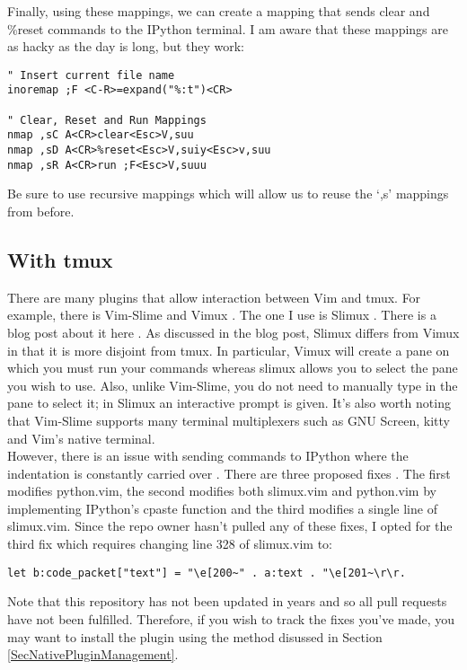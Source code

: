 \documentclass[10pt]{article}
\begin{document}
Finally, using these mappings, we can create a mapping that sends clear and \%reset commands to the IPython terminal. I
am aware that these mappings are as hacky as the day is long, but they work:
\begin{lstlisting}
" Insert current file name
inoremap ;F <C-R>=expand("%:t")<CR>

" Clear, Reset and Run Mappings
nmap ,sC A<CR>clear<Esc>V,suu
nmap ,sD A<CR>%reset<Esc>V,suiy<Esc>v,suu
nmap ,sR A<CR>run ;F<Esc>V,suuu
\end{lstlisting}
Be sure to use recursive mappings which will allow us to reuse the `,s' mappings from before.

\subsection{With tmux}
There are many plugins that allow interaction between Vim and tmux. For example, there is Vim-Slime
\cite{jpalardy2012slime} and Vimux \cite{benmills2009vimux}. The one I use is Slimux \cite{esamattis2015slimux}. There
is a blog post about it here \cite{suuronen2012slimux}. As discussed in the blog post, Slimux differs from Vimux in
that it is more disjoint from tmux. In particular, Vimux will create a pane on which you must run your commands whereas
slimux allows you to select the pane you wish to use. Also, unlike Vim-Slime, you do not need to manually type in the
pane to select it; in Slimux an interactive prompt is given. It's also worth noting that Vim-Slime supports many
terminal multiplexers such as GNU Screen, kitty and Vim's native terminal.\\

However, there is an issue with sending commands to IPython where the indentation is constantly carried over
\cite{kmARC2015indentationerror}. There are three proposed fixes
\cite{lotabout2017remove,karadaharu2016add,zcesur2018fix}. The first modifies python.vim, the second modifies both
slimux.vim and python.vim by implementing IPython's cpaste function and the third modifies a single line of slimux.vim.
Since the repo owner hasn't pulled any of these fixes, I opted for the third fix which requires changing line 328 of
slimux.vim to:
\begin{lstlisting}
let b:code_packet["text"] = "\e[200~" . a:text . "\e[201~\r\r.
\end{lstlisting}
Note that this repository has not been updated in years and so all pull requests have not been fulfilled. Therefore, if
you wish to track the fixes you've made, you may want to install the plugin using the method disussed in Section
\ref{SecNativePluginManagement}.\\
\end{document}
